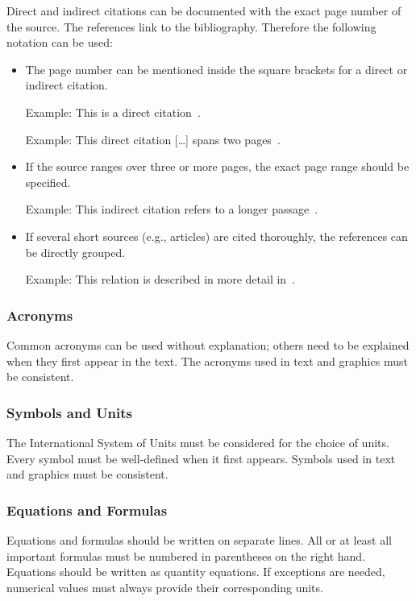 Direct and indirect citations can be documented with the exact page number of the source. The references link to the bibliography. Therefore the following notation can be used:
\begin{itemize}
	\item The page number can be mentioned inside the square brackets for a direct or indirect citation.
	
	Example: This is a direct citation~\cite[p.~4]{lecun1998gradient}.
	
	Example: This direct citation [\ldots] spans two pages~\cite[p.~4 f.]{lecun1998gradient}.
	\item If the source ranges over three or more pages, the exact page range should be specified.
	
	Example: This indirect citation refers to a longer passage~\cite[p.~4--8]{lecun1998gradient}.
	
	\item If several short sources (e.g., articles) are cited thoroughly, the references can be directly grouped.
	
	Example: This relation is described in more detail in~\cite{krizhevsky2012imagenet,lecun1998gradient}.
\end{itemize}

\subsubsection{Acronyms}

Common acronyms can be used without explanation; others need to be explained when they first appear in the text. The acronyms used in text and graphics must be consistent.

\subsubsection{Symbols and Units}

The International System of Units must be considered for the choice of units. Every symbol must be well-defined when it first appears. Symbols used in text and graphics must be consistent.

\subsubsection{Equations and Formulas}

Equations and formulas should be written on separate lines. All or at least all important formulas must be numbered in parentheses on the right hand. Equations should be written as quantity equations. If exceptions are needed, numerical values must always provide their corresponding units. 

